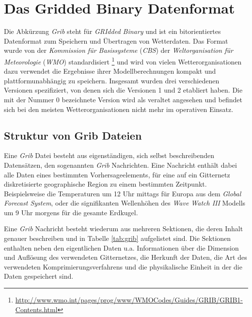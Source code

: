 \section{Das Gridded Binary Datenformat}

Die Abkürzung \textit{Grib}  steht
für \textit{GRIdded Binary} und ist ein bitorientiertes Datenformat
zum Speichern und Übertragen von Wetterdaten. Das Format wurde von der
\textit{Kommission für Basissysteme} (\textit{CBS})
 der
\textit{Weltorganisation für Meteorologie} (\textit{WMO})
 standardisiert
\footnote{\url{http://www.wmo.int/pages/prog/www/WMOCodes/Guides/GRIB/GRIB1-Contents.html}}
und wird von vielen Wetterorganisationen dazu verwendet die Ergebnisse
ihrer Modellberechnungen kompakt und plattformunabhängig zu
speichern. Insgesamt wurden drei verschiedenen Versionen spezifiziert,
von denen sich die Versionen 1 und 2 etabliert haben. Die mit der
Nummer 0 bezeichnete Version wird als veraltet angesehen und befindet
sich bei den meisten Wetterorganisationen nicht mehr im operativen
Einsatz.

\subsection{Struktur von Grib Dateien}

Eine \textit{Grib} Datei besteht aus eigenständigen, sich selbst
beschreibenden Datensätzen, den sogenannten \textit{Grib}
Nachrichten. Eine Nachricht enthält dabei alle Daten eines bestimmten
Vorhersageelements, für eine auf ein Gitternetz diskretisierte
geographische Region zu einem bestimmten Zeitpunkt. Beispielsweise die
Temperaturen um 12 Uhr mittags für Europa aus dem \textit{Global
  Forecast System}, oder die signifikanten Wellenhöhen des
\textit{Wave Watch III} Modells um 9 Uhr morgens für die gesamte
Erdkugel.

Eine \textit{Grib} Nachricht besteht wiederum aus mehreren Sektionen,
die deren Inhalt genauer beschreiben und in Tabelle \ref{tab:grib}
aufgelistet sind. Die Sektionen enthalten neben den eigentlichen Daten
u.a. Informationen über die Dimension und Auflösung des verwendeten
Gitternetzes, die Herkunft der Daten, die Art des verwendeten
Komprimierungsverfahrens und die physikalische Einheit in der die
Daten gespeichert sind.

